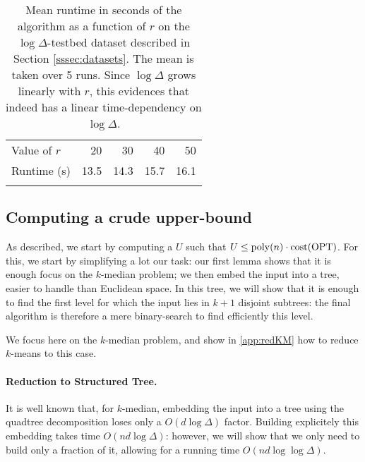 \begin{table}[htbp]
    \centering
    \begin{tabular}{lrrrr}
        \hline
        Value of $r$ & 20 & 30 & 40 & 50 \\
        Runtime (s) & 13.5 & 14.3 & 15.7 & 16.1 \\
        \hline
        \vspace*{0.1cm}
    \end{tabular}
    \caption{Mean runtime in seconds of the \fkmeans algorithm as a function of $r$ on the $\log \Delta$-testbed dataset described in Section
    \ref{sssec:datasets}. The mean is taken over 5 runs.  Since $\log \Delta$ grows linearly with $r$, this evidences that \fkmeans indeed has a linear
    time-dependency on $\log \Delta$.}
    \label{tbl:logdelta}
\end{table}


\subsection{Computing a crude upper-bound}
As described, we start by computing a $U$ such that $U \leq \operatorname{poly}(n) \cdot \operatorname{cost}(\text{OPT})$. For this, we start by simplifying a lot our task: our first lemma shows
that it is enough focus on the $k$-median problem; we then embed the input into a tree, easier to handle than Euclidean space. In this tree, we will show that
it is enough to find the first level for which the input lies in $k+1$ disjoint subtrees: the final algorithm is therefore a mere binary-search to find
efficiently this level.

We focus here on the $k$-median problem, and show in \cref{app:redKM} how to reduce $k$-means to this case.

\paragraph{Reduction to Structured Tree.}
\newcommand{\boxsize}{\textsc{MaxDist}}
It is well known that, for $k$-median, embedding the input into a tree using the quadtree decomposition loses only a $O(d \log \Delta)$ factor. Building explicitely this embedding takes time $O(nd \log \Delta)$: however, we will show that we only need to build only a fraction of it, allowing for a running time $O(nd \log \log \Delta)$. 

